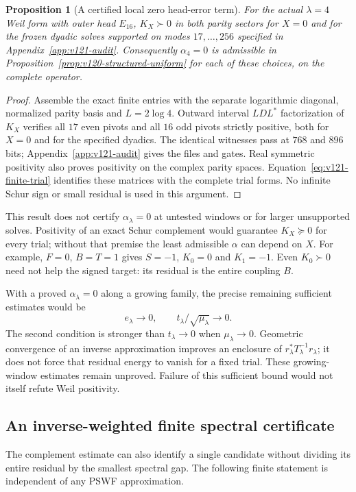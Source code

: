 \documentclass[11pt]{article}
\newtheorem{proposition}[theorem]{Proposition}
\theoremstyle{remark}
\begin{document}
\begin{proposition}[A certified local zero head-error term]
\label{prop:v121-alpha-zero}
For the actual $\lambda=4$ Weil form with outer head $E_{16}$,
$K_X\succ0$ in both parity sectors for $X=0$ and for the frozen
dyadic solves supported on modes $17,\ldots,256$ specified in
Appendix~\ref{app:v121-audit}. Consequently $\alpha_4=0$ is
admissible in Proposition~\ref{prop:v120-structured-uniform} for
each of these choices, on the complete operator.
\end{proposition}
\begin{proof}
Assemble the exact finite entries with the separate logarithmic
diagonal, normalized parity basis and $L=2\log4$. Outward interval
$LDL^*$ factorization of $K_X$ verifies all $17$ even pivots and
all $16$ odd pivots strictly positive, both for $X=0$ and for the
specified dyadics. The identical witnesses pass at $768$ and $896$
bits; Appendix~\ref{app:v121-audit} gives the files and gates.
Real symmetric positivity also proves positivity on the complex
parity spaces. Equation~\eqref{eq:v121-finite-trial} identifies these
matrices with the complete trial forms. No infinite Schur sign or
small residual is used in this argument.
\end{proof}

This result does not certify $\alpha_\lambda=0$ at untested windows
or for larger unsupported solves. Positivity of an exact Schur
complement would guarantee $K_X\succeq0$ for every trial; without
that premise the least admissible $\alpha$ can depend on $X$.
For example, $F=0$, $B=T=1$ gives $S=-1$, $K_0=0$ and $K_1=-1$.
Even $K_0\succ0$ need not help the signed target: its residual is
the entire coupling $B$.

With a proved $\alpha_\lambda=0$ along a growing family, the precise
remaining sufficient estimates would be
\begin{equation}\label{eq:v121-scaled-target}
 e_\lambda\longrightarrow0,
 \qquad t_\lambda/\sqrt{\mu_\lambda}\longrightarrow0.
\end{equation}
The second condition is stronger than $t_\lambda\to0$ when
$\mu_\lambda\to0$. Geometric convergence of an inverse approximation
improves an enclosure of $r_\lambda^*T_\lambda^{-1}r_\lambda$;
it does not force that residual energy to vanish for a fixed trial.
These growing-window estimates remain unproved. Failure of this
sufficient bound would not itself refute Weil positivity.


\subsection*{An inverse-weighted finite spectral certificate}
The complement estimate can also identify a single candidate without
dividing its entire residual by the smallest spectral gap.
The following finite statement is independent of any PSWF approximation.
\end{document}
